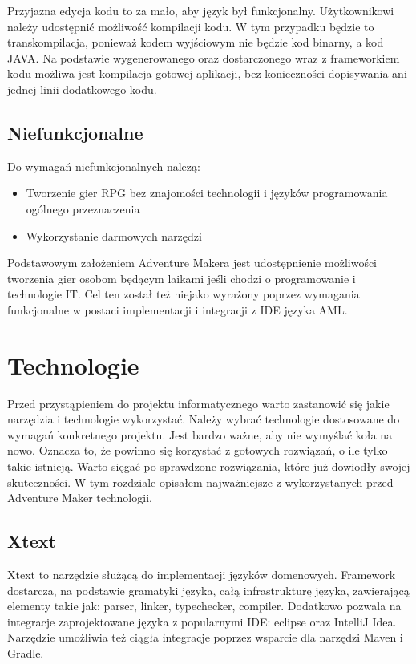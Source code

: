 \documentclass{xmgr}
\begin{document}
Przyjazna edycja kodu to za mało, aby język był funkcjonalny. Użytkownikowi należy udostępnić możliwość kompilacji kodu. W tym przypadku będzie to transkompilacja, ponieważ kodem wyjściowym nie będzie kod binarny, a kod JAVA. Na podstawie wygenerowanego oraz dostarczonego wraz z frameworkiem kodu możliwa jest kompilacja gotowej aplikacji, bez konieczności dopisywania ani jednej linii dodatkowego kodu. 

\section{Niefunkcjonalne}
Do wymagań niefunkcjonalnych nalezą:
\begin{itemize}
	\item Tworzenie gier RPG bez znajomości technologii i języków programowania ogólnego przeznaczenia
	\item Wykorzystanie darmowych narzędzi
\end{itemize}

Podstawowym założeniem Adventure Makera jest udostępnienie możliwości tworzenia gier osobom będącym laikami jeśli chodzi o programowanie i technologie IT. Cel ten został też niejako wyrażony poprzez wymagania funkcjonalne w postaci implementacji i integracji z IDE języka AML.

\chapter{Technologie}
Przed przystąpieniem do projektu informatycznego warto zastanowić się jakie narzędzia i technologie wykorzystać. Należy wybrać technologie dostosowane do wymagań konkretnego projektu. Jest bardzo ważne, aby nie wymyślać koła na nowo. Oznacza to, że powinno się korzystać z gotowych rozwiązań, o ile tylko takie istnieją. Warto sięgać po sprawdzone rozwiązania, które już dowiodły swojej skuteczności. W tym rozdziale opisałem najważniejsze z wykorzystanych przed Adventure Maker technologii.

\section{Xtext}

Xtext \cite{Xtext:2017:Doc} to narzędzie służącą do implementacji języków domenowych. Framework dostarcza, na podstawie gramatyki języka, całą infrastrukturę języka, zawierającą elementy takie jak: parser, linker, typechecker, compiler. Dodatkowo pozwala na integracje zaprojektowane języka z popularnymi IDE: eclipse oraz IntelliJ Idea. Narzędzie umożliwia też ciągła integracje poprzez wsparcie dla narzędzi Maven i Gradle.
\end{document}
